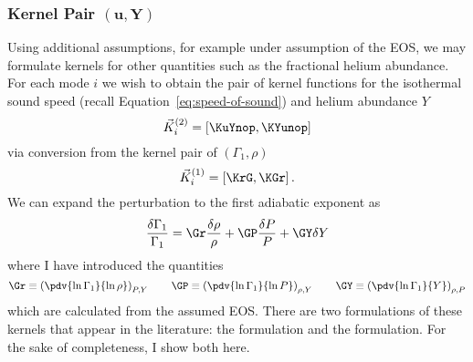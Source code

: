 \iffalse
\subsubsection*{Kernel Pair \texorpdfstring{$\mathbf{(\Gamma_1, c^2)}$}{(Gamma1,c2)}}
\begin{align}
    \KGcs &= P \cdot \ddr \left( \frac{\psi}{P} \right)
\\  \KcsG &= \Kcsr-\KGcs
\end{align}    
\fi

\subsubsection*{Kernel Pair $\mathbf{(u,Y)}$}
\noindent
Using additional assumptions, for example under assumption of the EOS, we may formulate kernels for other quantities such as the fractional helium abundance. 
For each mode $i$ we wish to obtain the pair of kernel functions for the isothermal sound speed (recall Equation~\ref{eq:speed-of-sound}) and helium abundance $Y$
\begin{equation}
    \vec K^{(2)}_i = \left[ \KuYnop, \KYunop \right]
\end{equation}
via conversion from the kernel pair of ${(\Gamma_1, \rho)}$
\begin{equation}
    \vec K^{(1)}_i = \left[ \KrG, \KGr \right].
\end{equation}
We can expand the perturbation to the first adiabatic exponent as
\begin{equation}
    \frac{\delta \Gamma_1}{\Gamma_1}
    =
    \Gr \frac{\delta\rho}{\rho}
    +
    \GP \frac{\delta P}{P}
    +
    \GY \delta Y
\end{equation}
where I have introduced the quantities
\begin{equation}
    \Gr \equiv \left( \pdv{\ln \Gamma_1}{\ln \rho} \right)_{P, Y} \qquad 
    \GP \equiv \left( \pdv{\ln \Gamma_1}{\ln P} \right)_{\rho, Y} \qquad
    \GY \equiv \left( \pdv{\ln \Gamma_1}{Y} \right)_{\rho, P}
\end{equation} 
which are calculated from the assumed EOS. 
There are two formulations of these kernels that appear in the literature: the \citet{ThompsonJCD2002} formulation and the \citet{Kosovichev1999} formulation. 
For the sake of completeness, I show both here. 

